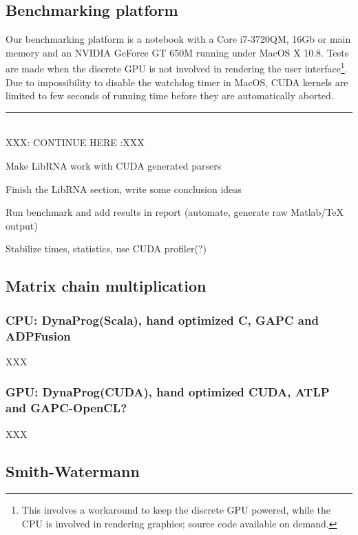 \subsection{Benchmarking platform}
Our benchmarking platform is a notebook with a Core i7-3720QM, 16Gb or main memory and an NVIDIA GeForce GT 650M running under MacOS X 10.8. Tests are made when the discrete GPU is not involved in rendering the user interface\footnote{This involves a workaround to keep the discrete GPU powered, while the CPU is involved in rendering graphics; source code available on demand.}. Due to impossibility to disable the watchdog timer in MacOS, CUDA kernels are limited to few seconds of running time before they are automatically aborted.

{\center\color{red} \noindent\rule{16cm}{0.4pt} \\ XXX: CONTINUE HERE :XXX \\}

{\color{red}\ol
\item Make LibRNA work with CUDA generated parsers
\item Finish the LibRNA section, write some conclusion ideas
\item Run benchmark and add results in report (automate, generate raw Matlab/TeX output)
\item Stabilize times, statistics, use CUDA profiler(?)
\ole}

\subsection{Matrix chain multiplication}
\subsubsection{CPU: DynaProg(Scala), hand optimized C, GAPC and ADPFusion}
XXX

\subsubsection{GPU: DynaProg(CUDA), hand optimized CUDA, ATLP and GAPC-OpenCL?}
XXX

\subsection{Smith-Watermann}
